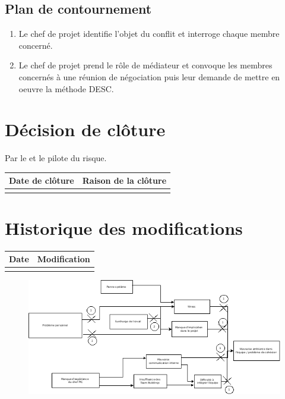 \flushleft
\subsection*{Plan de contournement}

\begin{enumerate}
	\item Le chef de projet identifie l'objet du conflit et interroge chaque membre concerné.
	\item Le chef de projet prend le rôle de médiateur et convoque les membres concernés à une réunion de négociation puis leur demande de mettre en oeuvre la méthode DESC.
\end{enumerate}

\section*{Décision de clôture}
Par le \CP{} et le pilote du risque.
\begin{table}[H]
\centering
	\begin{tabularx}{16.8cm}{|X|X|}
	\hline
	\rowcolor{gray!40} Date de clôture & Raison de la clôture \\
	\hline
	  & \\
	\hline
	\end{tabularx}
\end{table}

\section*{Historique des modifications}
\begin{table}[H]
\centering
	\begin{tabularx}{16.8cm}{|X|X|}
	\hline
	Date & Modification \\
	\hline
	  & \\
	\hline
	\end{tabularx}
\end{table}
\newpage

\begin{landscape}
\begin{figure}
	\centering
	\includegraphics[scale=0.84]{images/AnalyseRisque_nPourquoi_FDR002}
\end{figure}
\end{landscape}